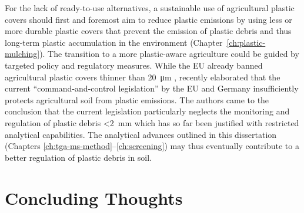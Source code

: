 For the lack of ready-to-use alternatives, a sustainable use of agricultural plastic covers should first and foremost aim to reduce plastic emissions by using less or more durable plastic covers that prevent the emission of plastic debris and thus long-term plastic accumulation in the environment (Chapter~\ref{ch:plastic-mulching}).
The transition to a more plastic-aware agriculture could be guided by targeted policy and regulatory measures. While the EU already banned agricultural plastic covers thinner than \SI{20}{\micro\meter} \citep[Chapter~\ref{ch:screening};][]{EN13655Plastics2018}, \citet{StubenrauchPlastic2020} recently elaborated that the current ``command-and-control legislation'' by the EU and Germany insufficiently protects agricultural soil from plastic emissions. The authors came to the conclusion that the current legislation particularly neglects the monitoring and regulation of plastic debris \SI{<2}{\milli\meter} which has so far been justified with restricted analytical capabilities. The analytical advances outlined in this dissertation (Chapters \ref{ch:tga-ms-method}--\ref{ch:screening}) may thus eventually contribute to a better regulation of plastic debris in soil.

\section{Concluding Thoughts}
\label{sec:general-discussion:conclusion}

